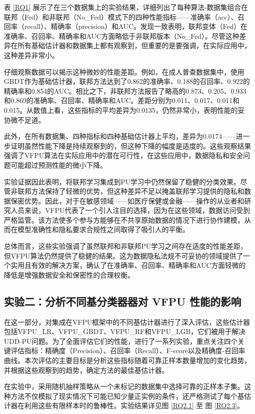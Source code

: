 表 \ref{RQ1} 展示了在三个数据集上的实验结果，详细列出了每种算法-数据集组合在联邦（Fed）和非联邦（No\_Fed）模式下的四种性能指标——准确率（acc）、召回率（recall）、精确率（precision）和AUC。发现一致表明，联邦变体（Fed）在准确率、召回率、精确率和AUC方面略低于非联邦版本（No\_Fed）。尽管这种差异在所有基础估计器和数据集上都有观察到，但重要的是要强调，在实际应用中，这种差异非常小。

仔细观察数据可以揭示这种微妙的性能差距。例如，在成人普查数据集中，使用GBDT作为基础估计器，联邦方法达到了0.862的准确率、0.188的召回率、0.922的精确率和0.854的AUC。相比之下，非联邦方法报告了略高的0.873、0.205、0.933和0.869的准确率、召回率、精确率和AUC。差距分别为0.011、0.017、0.011和0.015。从数值上看，这些指标的平均差异为0.0135，仍然非常小，表明性能的妥协微不足道。

此外，在所有数据集、四种指标和四种基础估计器上平均，差异为0.0174——进一步证明虽然性能下降是持续观察到的，但这种下降的幅度是适度的。这些观察结果强调了VFPU算法在实际应用中的潜在可行性，在这些应用中，数据隐私和安全问题可能超过预测性能的微小下降。

实验证据因此表明，将联邦学习集成到PU学习中仍然保留了稳健的分类效果。尽管非联邦方法保持了轻微的优势，但这种差异不足以掩盖联邦学习提供的隐私和数据保密优势。因此，对于在敏感领域——如医疗保健或金融——操作的从业者和研究人员来说，VFPU代表了一个引人注目的选择，因为在这些领域，数据访问受到严格监管。该方法使多个参与方能够在不共享原始数据的情况下进行协作建模，从而在模型准确性和隐私要求合规性之间取得了吸引人的平衡。

总体而言，这些实验强调了虽然联邦和非联邦PU学习之间存在适度的性能差距，但VFPU算法仍然提供了稳健的结果。这为数据隐私法规不可妥协的领域提供了一个实用且有效的解决方案，确认了在准确率、召回率、精确率和AUC方面轻微的降低是增强数据安全和保密性的合理权衡。

\subsection{实验二：分析不同基分类器器对 VFPU 性能的影响}

在这一部分，对集成在VFPU框架中的不同基估计器进行了深入评估，这些估计器包括VFPU\_LR、VFPU\_GBDT、VFPU\_RF和VFPU\_LGB，它们被用于解决UDD-PU问题。为了全面评估它们的性能，进行了一系列实验，重点关注四个关键评估指标：精确度（Precision）、召回率（Recall）、F-score以及精确度-召回率曲线。本次评估的主要目标是分析这些指标随着可靠正样本数量增加的变化趋势，并根据这些观察到的趋势，确定方法的最佳基估计器。

在实验中，采用随机抽样策略从一个未标记的数据集中选择可靠的正样本子集。这种方法不仅模拟了现实情况下可能已知少量正实例的条件，还严格测试了每个基估计器在利用这些有限样本时的鲁棒性。实验结果详见图 \ref{RQ2.1} 至 图 \ref{RQ2.3}。


